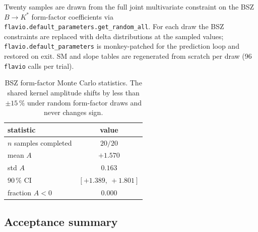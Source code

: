 Twenty samples are drawn from the full joint multivariate constraint
on the BSZ $B\to K^{*}$ form-factor coefficients
\citep{Bharucha2016BSZ} via
\texttt{flavio.\allowbreak default\_parameters.\allowbreak get\_random\_all}.
For each draw the BSZ constraints are replaced with delta
distributions at the sampled values;
\texttt{flavio.\allowbreak default\_parameters} is monkey-patched
for the prediction loop and restored on exit. SM and slope tables
are regenerated from scratch per draw (96 \texttt{flavio} calls per
trial).

\begin{table}[h]
\centering
\small
\begin{tabular}{lc}
\toprule
statistic & value \\
\midrule
$n$ samples completed   & $20/20$ \\
mean $A$                & $+1.570$ \\
std $A$                 & $0.163$ \\
$90\,\%$ CI             & $[+1.389,\ +1.801]$ \\
fraction $A<0$          & $0.000$ \\
\bottomrule
\end{tabular}
\caption{BSZ form-factor Monte Carlo statistics. The shared
kernel amplitude shifts by less than $\pm 15\,\%$ under random
form-factor draws and never changes sign.}
\label{tab:ff_mc}
\end{table}

\subsection{Acceptance summary}

